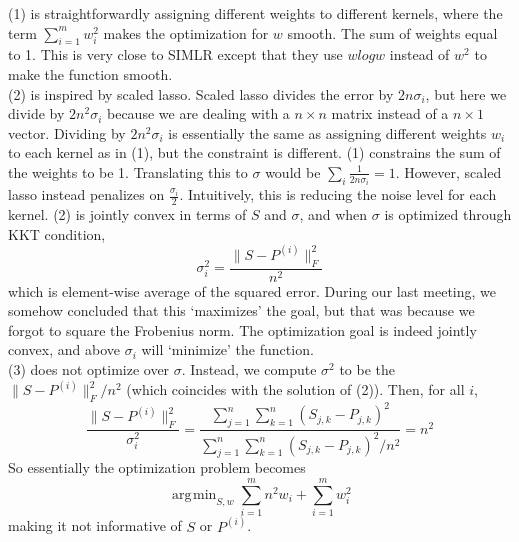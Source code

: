 \documentclass[11pt]{article}
\DeclareMathOperator*{\argmin}{\arg\!\min}
\begin{document}
\noindent (1) is straightforwardly assigning different weights to different kernels, where the term $\sum_{i=1}^{m} w_i^2$ makes the optimization for $w$ smooth. The sum of weights equal to 1. This is very close to SIMLR except that they use $w log w$ instead of $w^2$ to make the function smooth.\\

\noindent (2) is inspired by scaled lasso. Scaled lasso divides the error by $2n\sigma_i$, but here we divide by $2n^2 \sigma_i$ because we are dealing with a $n \times n$ matrix instead of a $n \times 1$ vector. Dividing by $2n^2\sigma_i$ is essentially the same as assigning different weights $w_i$ to each kernel as in (1), but the constraint is different. (1) constrains the sum of the weights to be 1. Translating this to $\sigma$ would be $\sum_{i} \frac{1}{2n\sigma_i} = 1$. However, scaled lasso instead penalizes on $\frac{\sigma_i}{2}$. Intuitively, this is reducing the noise level for each kernel. (2) is jointly convex in terms of $S$ and $\sigma$, and when $\sigma$ is optimized through KKT condition, 
$$\sigma_i^2 = \frac{\|S - P^{(i)}\|_F^2}{n^2}$$
which is element-wise average of the squared error. During our last meeting, we somehow concluded that this `maximizes' the goal, but that was because we forgot to square the Frobenius norm. The optimization goal is indeed jointly convex, and above $\sigma_i$ will `minimize' the function.\\

\noindent (3) does not optimize over $\sigma$. Instead, we compute $\sigma^2$ to be the $\|S - P^{(i)}\|_F^2 / n^2$ (which coincides with the solution of (2)). Then, for all $i$,
$$\frac{\|S - P^{(i)}\|_F^2}{\sigma_i^2} = \frac{\sum_{j=1}^{n} \sum_{k=1}^{n}  (S_{j,k} - P_{j,k})^2}{\sum_{j=1}^{n} \sum_{k=1}^{n}  (S_{j,k} - P_{j,k})^2 / n^2} = n^2$$
So essentially the optimization problem becomes
$$\argmin_{S,w} \sum_{i=1}^{m} n^2 w_i + \sum_{i=1}^{m} w_i^2$$
making it not informative of $S$ or $P^{(i)}$.\\


\pagebreak 
\end{document}
